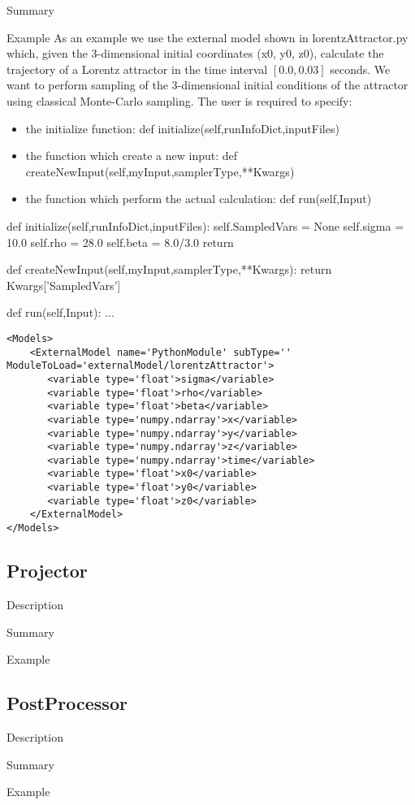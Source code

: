 Summary

Example
As an example we use the external model shown in lorentzAttractor.py which, given the 3-dimensional initial coordinates (x0, y0, z0), calculate the trajectory of a Lorentz attractor in the time interval $[0.0,0.03]$ seconds.
We want to perform sampling of the 3-dimensional initial conditions of the attractor using classical Monte-Carlo sampling.
The user is required to specify:
\begin{itemize}
\item the initialize function: def initialize(self,runInfoDict,inputFiles)
\item the function which create a new input: def createNewInput(self,myInput,samplerType,**Kwargs)
\item the function which perform the actual calculation: def run(self,Input)
\end{itemize}

\begin{python}
def initialize(self,runInfoDict,inputFiles):
  self.SampledVars = None
  self.sigma = 10.0
  self.rho   = 28.0
  self.beta  = 8.0/3.0
  return

def createNewInput(self,myInput,samplerType,**Kwargs):
  return Kwargs['SampledVars']

def run(self,Input):
   ...
\end{python}


\begin{lstlisting}[style=XML]
<Models>
    <ExternalModel name='PythonModule' subType='' ModuleToLoad='externalModel/lorentzAttractor'>  
       <variable type='float'>sigma</variable>
       <variable type='float'>rho</variable>
       <variable type='float'>beta</variable>
       <variable type='numpy.ndarray'>x</variable>
       <variable type='numpy.ndarray'>y</variable>
       <variable type='numpy.ndarray'>z</variable>
       <variable type='numpy.ndarray'>time</variable>
       <variable type='float'>x0</variable>
       <variable type='float'>y0</variable>
       <variable type='float'>z0</variable>
    </ExternalModel>
</Models> 
\end{lstlisting}

\subsection{Projector}
\label{sec:models_projector}

Description

Summary

Example

\subsection{PostProcessor}
\label{sec:models_postProcessor}

Description

Summary

Example